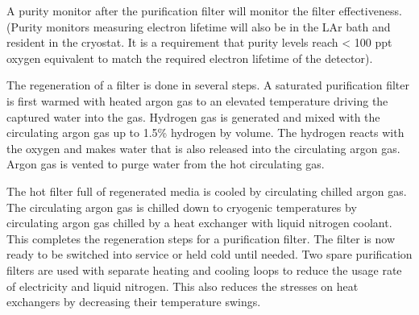 A purity monitor after the purification filter will monitor the filter 
effectiveness. (Purity monitors measuring electron lifetime will also 
be in the LAr bath and resident in the cryostat. It is a requirement 
that purity levels reach < 100 ppt oxygen equivalent to match the 
required electron lifetime of the detector). 

The regeneration of a filter is done in several steps. A saturated 
purification filter is first warmed with heated argon gas to an 
elevated temperature driving the captured water into the gas. 
Hydrogen gas is generated and mixed with the circulating argon 
gas up to 1.5\% hydrogen by volume. The hydrogen reacts with the 
oxygen and makes water that is also released into the circulating 
argon gas. Argon gas is vented to purge water from the hot 
circulating gas. 

The hot filter full of regenerated media is cooled by circulating 
chilled argon gas. The circulating argon gas is chilled down to
cryogenic temperatures by circulating argon gas chilled by a 
heat exchanger with liquid nitrogen coolant. This completes the 
regeneration steps for a purification filter. The filter is now 
ready to be switched into service or held cold until needed. Two 
spare purification filters are used with separate heating and 
cooling loops to reduce the usage rate of electricity and liquid 
nitrogen. This also reduces the stresses on heat exchangers by 
decreasing their temperature swings.

